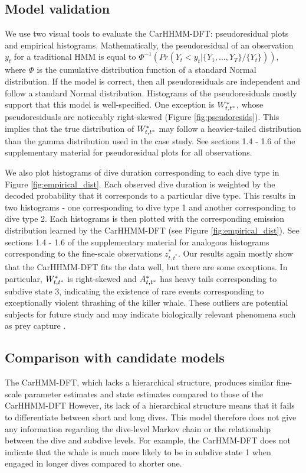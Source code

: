 \subsection{Model validation}
\label{subsec:model_validation}

We use two visual tools to evaluate the CarHHMM-DFT: pseudoresidual plots and empirical histograms. Mathematically, the pseudoresidual of an observation $y_t$ for a traditional HMM is equal to $\Phi^{-1} \left(Pr(Y_t < y_t|\{Y_1,\ldots,Y_T\}/\{Y_t\}) \right)$, where $\Phi$ is the cumulative distribution function of a standard Normal distribution. If the model is correct, then all pseudoresiduals are independent and follow a standard Normal distribution. Histograms of the pseudoresiduals mostly support that this model is well-specified. One exception is $W^*_{t,t^*}$, whose pseudoresiduals are noticeably right-skewed (Figure \ref{fig:pseudoresids}). This implies that the true distribution of $W^*_{t,t^*}$ may follow a heavier-tailed distribution than the gamma distribution used in the case study. See sections 1.4 - 1.6 of the supplementary material for pseudoresidual plots for all observations.

We also plot histograms of dive duration corresponding to each dive type in Figure \ref{fig:empirical_dist}. Each observed dive duration is weighted by the decoded probability that it corresponds to a particular dive type. This results in two histograms - one corresponding to dive type 1 and another corresponding to dive type 2. Each histograms is then plotted with the corresponding emission distribution learned by the CarHHMM-DFT (see Figure \ref{fig:empirical_dist}). See sections 1.4 - 1.6 of the supplementary material for analogous histograms corresponding to the fine-scale observations $z^*_{t,t^*}$. Our results again mostly show that the CarHHMM-DFT fits the data well, but there are some exceptions. In particular, $W^*_{t,t^*}$ is right-skewed and $A^*_{t,t^*}$ has heavy tails corresponding to subdive state 3, indicating the existence of rare events corresponding to exceptionally violent thrashing of the killer whale. These outliers are potential subjects for future study and may indicate biologically relevant phenomena such as prey capture \citep{Tennessen:2019a}.

\subsection{Comparison with candidate models}

The CarHMM-DFT, which lacks a hierarchical structure, produces similar fine-scale parameter estimates and state estimates compared to those of the CarHHMM-DFT However, its lack of a hierarchical structure means that it fails to differentiate between short and long dives. This model therefore does not give any information regarding the dive-level Markov chain or the relationship between the dive and subdive levels. For example, the CarHMM-DFT does not indicate that the whale is much more likely to be in subdive state 1 when engaged in longer dives compared to shorter one.

